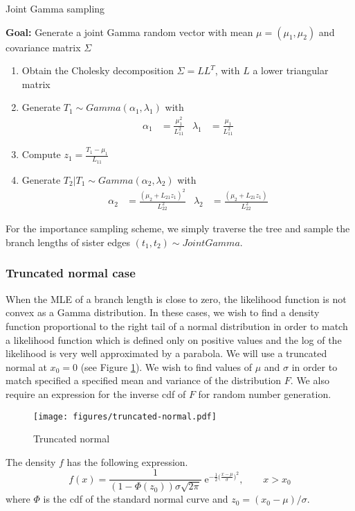 \documentclass[conference]{IEEEtran}
\begin{document}
\begin{algorithm}
\caption{Joint Gamma sampling}
\textbf{Goal:} Generate a joint Gamma random vector with mean $\mu=(\mu_1, \mu_2)$
and covariance matrix $\Sigma$
\begin{enumerate}
\item{Obtain the Cholesky decomposition $\Sigma=LL^T$, with $L$ a
    lower triangular matrix}
\item{Generate $T_1 \sim Gamma(\alpha_1, \lambda_1)$ with
\begin{align*}
\alpha_1 &= \frac{\mu_1^2}{L_{11}^2} & \lambda_1 &= \frac{\mu_1}{L_{11}^2}
\end{align*}}
\item{Compute $z_1 = \frac{T_1-\mu_1}{L_{11}}$}
\vspace{0.25cm}
\item{Generate $T_2|T_1 \sim Gamma(\alpha_2, \lambda_2)$ with
\begin{align*}
\alpha_2 &= \frac{(\mu_2+L_{21}z_1)^2}{L_{22}^2} & \lambda_2 &= \frac{(\mu_2+L_{21}z_1)}{L_{22}^2}
\end{align*}}
\end{enumerate}
\end{algorithm}

For the importance sampling scheme, we simply traverse the tree and
sample the branch lengths of sister edges $(t_1,t_2) \sim Joint
Gamma$.

\subsubsection*{Truncated normal case}
When the MLE of a branch length is close to zero, the likelihood
function is not convex as a Gamma distribution.  In these cases, we
wish to find a density function proportional to the right tail of a
normal distribution in order to match a likelihood function which is
defined only on positive values and the log of the likelihood is very
well approximated by a parabola. We will use a truncated normal at
$x_0=0$ (see Figure \ref{trun-norm}). We wish to find values of $\mu$
and $\sigma$ in order to match specified a specified mean and variance
of the distribution $F$.  We also require an expression for the
inverse cdf of $F$ for random number generation.
\begin{figure}
\centering
\texttt{[image: figures/truncated-normal.pdf]}
\caption{Truncated normal}
\label{trun-norm}
\end{figure}

The density $f$ has the following expression.
$$
f(x) = \frac{1}{(1 - \Phi(z_0))\sigma\sqrt{2\pi}}\;
\mathrm{e}^{-\frac{1}{2}\big(\frac{x-\mu}{\sigma}\big)^2}, \qquad x >
x_0
$$
where $\Phi$ is the cdf of the standard normal curve and $z_0 = (x_0-\mu)/\sigma$.
\end{document}
